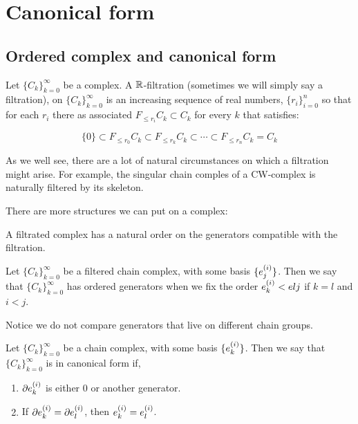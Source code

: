 
\chapter{Canonical form}



\section{Ordered complex and canonical form}


\begin{definition}
Let $\{C_k\}_{k=0}^{\infty}$ be a complex. 
A $\mathbb{R}$-filtration (sometimes we will simply say a filtration), on $\{C_k\}_{k=0}^{\infty}$ 
is an increasing sequence of real numbers, $\{r_i\}_{i=0}^n$
so that for each $r_i$ there as associated $F_{\leq r_i}C_k\subset C_k$ for every $k$
that satisfies:

$$
\{0\}\subset
F_{\leq r_0}C_k
\subset
F_{\leq r_k}C_k
\subset
\cdots
\subset
F_{\leq r_n}C_k
=
C_k
$$
\end{definition}

As we well see, there are a lot of natural circumstances on which a filtration might arise. For example, 
the singular chain comples of a CW-complex is naturally filtered by its skeleton.

There are more structures we can put on a complex:


\begin{remark}
A filtrated complex has a natural order on the generators compatible with the filtration.
\end{remark}

\begin{definition}

Let $\{C_k\}_{k=0}^{\infty}$ be a filtered chain complex, with some basis $\{e_{j}^{(i)}\}$.
Then we say that $\{C_k\}_{k=0}^{\infty}$ has ordered generators when we fix the order 
$e_{k}^{(i)}<e{l}{j}$ if  $k=l$ and $i<j$.

Notice we do not compare generators that live on different chain groups.
\end{definition}




\begin{definition}

Let $\{C_k\}_{k=0}^{\infty}$ be a chain complex, with some basis $\{e_{k}^{(i)}\}$.
Then we say that $\{C_k\}_{k=0}^{\infty}$ is in canonical form if,

\begin{enumerate}
\item $\partial e_{k}^{(i)}$
is either $0$ or another generator.

\item If $\partial e_{k}^{(i)}=\partial e_{l}^{(i)}$,
then $e_{k}^{(i)}= e_{l}^{(i)}$.
\end{enumerate}

\end{definition}


